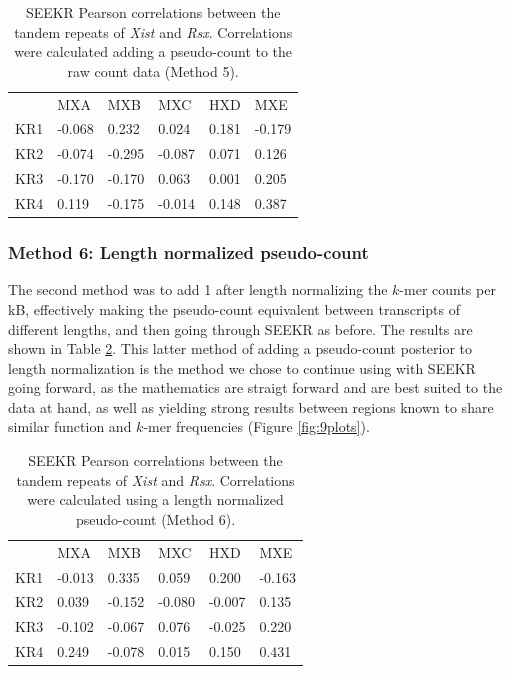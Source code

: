 \begin{table}[ht]
\begin{center}
\begin{tabular}{llllll}
&MXA & MXB                  & MXC                  & HXD                  & MXE                                         \\
KR1 & -0.068 & 0.232    & 0.024  & 0.181   & -0.179 \\
KR2 & -0.074 & -0.295 & -0.087 & 0.071  & 0.126  \\
KR3 & -0.170 & -0.170 & 0.063   & 0.001 & 0.205  \\
KR4 & 0.119  & -0.175  & -0.014 & 0.148   & 0.387
\end{tabular}
\caption{SEEKR Pearson correlations between the tandem repeats of \emph{Xist} and \emph{Rsx}. Correlations were calculated adding a pseudo-count to the raw count data (Method 5).}
\label{tbl:kmers5}
\end{center}
\end{table}

\subsubsection{Method 6: Length normalized pseudo-count}
The second method was to add 1 after length normalizing the $k$-mer counts per kB, effectively making the pseudo-count equivalent between transcripts of different lengths, and then going through SEEKR as before. The results are shown in Table \ref{tbl:kmers6}. This latter method of adding a pseudo-count posterior to length normalization is the method we chose to continue using with SEEKR going forward, as the mathematics are straigt forward and are best suited to the data at hand, as well as yielding strong results between regions known to share similar function and $k$-mer frequencies (Figure \ref{fig:9plots}). 

\begin{table}[ht]
\begin{center}
\begin{tabular}{llllll}
&MXA & MXB                   & MXC                  & HXD                  & MXE                                        \\
KR1 & -0.013 & 0.335  & 0.059  & 0.200  & -0.163 \\
KR2 & 0.039   & -0.152 & -0.080  & -0.007 & 0.135  \\
KR3 & -0.102   & -0.067 & 0.076  & -0.025 & 0.220   \\
KR4 & 0.249   & -0.078 & 0.015 & 0.150  & 0.431 
\end{tabular}
\caption{SEEKR Pearson correlations between the tandem repeats of \emph{Xist} and \emph{Rsx}. Correlations were calculated using a length normalized pseudo-count (Method 6).}
\label{tbl:kmers6}
\end{center}
\end{table}

